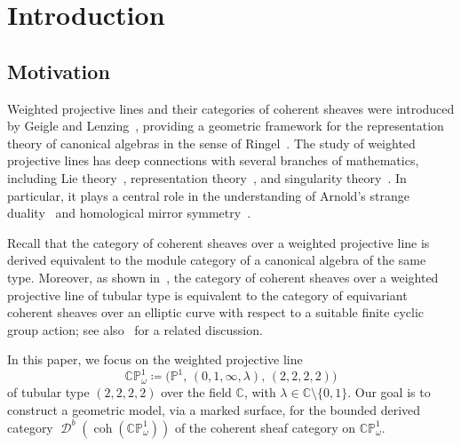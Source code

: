 \documentclass[11pt,a4paper,reqno]{amsart}%
\theoremstyle{plain}
\theoremstyle{definition}
\numberwithin{equation}{section}
\numberwithin{equation}{section}
\def\CC{\mathbb{C}}
\newcommand{\D}{\operatorname{\mathcal{D}}}
\def\wt{\omega}
\def\coh{\operatorname{coh}}
\def\coh{\operatorname{coh}}
\def\CPone{\mathbb{CP}^1_{\wt}}
\newcommand\DC[1]{\D^b(\coh(#1))}
\begin{document}
\maketitle
\tableofcontents
{}

\setlength\parindent{0pt}
\setlength{\parskip}{5pt}


\section{Introduction}
\subsection{Motivation}
  Weighted projective lines and their categories of coherent sheaves were introduced by Geigle and Lenzing~\cite{GL87}, providing a geometric framework for the representation theory of canonical algebras in the sense of Ringel~\cite{Ringel1984}. 
The study of weighted projective lines has deep connections with several branches of mathematics, including Lie theory~\cite{Crawley-Boevey2010,DengRuanXiao2020,DouJiangXiao2012,Schiffmann2004}, representation theory~\cite{M2004,CLLR2021,FG383,HR1999}, and singularity theory~\cite{EbelingPloog2010,Hubner1989,Hubner1996,Lenzing1994,Lenzing1998,Lenzing2011}. 
In particular, it plays a central role in the understanding of Arnold's strange duality~\cite{EbelingPloog2010,EbelingTakahashi2013} and homological mirror symmetry~\cite{Ebeling2003,Scerbak1978}.

Recall that the category of coherent sheaves over a weighted projective line is derived equivalent to the module category of a canonical algebra of the same type. 
Moreover, as shown in~\cite{GL87,Lenzing2004,CCZ}, the category of coherent sheaves over a weighted projective line of tubular type is equivalent to the category of equivariant coherent sheaves over an elliptic curve with respect to a suitable finite cyclic group action; see also~\cite{P2006} for a related discussion.

In this paper, we focus on the weighted projective line
\[
\CPone \coloneqq \bigl(\mathbb{P}^{1},\,(0,1,\infty,\lambda),\,(2,2,2,2)\bigr)
\]
of tubular type $(2,2,2,2)$ over the field $\CC$, with $\lambda\in \CC\setminus\{0,1\}$.
Our goal is to construct a geometric model, via a marked surface, for the bounded derived category $\DC{\CPone}$ of the coherent sheaf category on $\CPone$.
\end{document}
